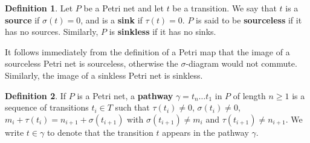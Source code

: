 \documentclass[aps,prd,onecolumn,nofootinbib,letterpaper,preprintnumbers,superscriptaddress,eqsecnum]{revtex4}
\theoremstyle{definition}
\newtheorem{definition}{Definition}
\begin{document}
\begin{definition}\label{def:source-sink}
    Let $P$ be a Petri net and let $t$ be a transition.
    We say that $t$ is a \textbf{source} if $\sigma(t) = 0$, and is a \textbf{sink} if $\tau(t) = 0$.
    $P$ is said to be \textbf{sourceless} if it has no sources.
    Similarly, $P$ is \textbf{sinkless} if it has no sinks.
\end{definition}

It follows immediately from the definition of a Petri map that the image of a sourceless Petri net is sourceless, otherwise the $\sigma$-diagram would not commute.
Similarly, the image of a sinkless Petri net is sinkless.

\begin{center}
\end{center}

\begin{definition}\label{def:pathway}
    If $P$ is a Petri net, a \textbf{pathway} $\gamma = t_n \ldots t_1$ in $P$ of length $n \ge 1$ is a sequence of transitions $t_i \in T$ such that $\tau(t_i) \ne 0$, $\sigma(t_i) \ne 0$, $m_{i} + \tau(t_i) = n_{i+1} + \sigma(t_{i+1})$ with $\sigma(t_{i+1}) \ne m_{i}$ and $\tau(t_{i+1}) \ne n_{i+1}$. We write $t \in \gamma$ to denote that the transition $t$ appears in the pathway $\gamma$.
\end{definition}
\end{document}
